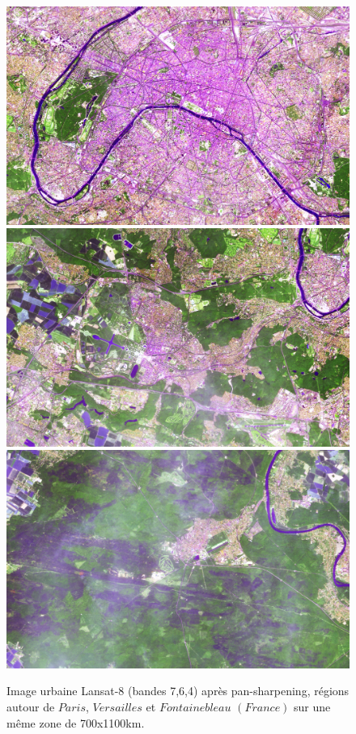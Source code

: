 \documentclass{book}
\begin{document}
\begin{figure}[H]
\begin{center}
\includegraphics[scale=0.28]{images/paris_urban_zoom_pansharpened.png}
\includegraphics[scale=0.28]{images/versailles_urban_zoom_pansharpened.png}
\includegraphics[scale=0.28]{images/fontainebleau_urban_zoom_pansharpened.png}
\end{center}
\caption{Image urbaine Lansat-8 (bandes 7,6,4) après pan-sharpening, régions autour de $Paris$, $Versailles$ et $Fontainebleau$ $(France)$ sur une même zone de 700x1100km.}
\label{urban}
\end{figure}
\end{document}
